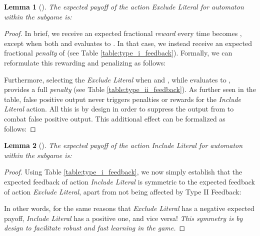 \documentclass[11pt,a4paper]{article}
\newtheorem{mylemma}{Lemma}
\begin{document}
\begin{mylemma}[]\label{lemma:exclude_literal}
The expected payoff of the action \emph{Exclude Literal} for automaton  within the subgame  is:

\end{mylemma}
\begin{proof}
In brief, we receive an expected fractional \emph{reward}  every time  becomes , except when both  and  evaluates to . In that case, we instead receive an expected fractional \emph{penalty} of  (see Table \ref{table:type_i_feedback}). Formally, we can reformulate this rewarding and penalizing as follows:

Furthermore, selecting the  \emph{Exclude Literal} when  and , while  evaluates to , provides a full \emph{penalty} (see Table \ref{table:type_ii_feedback}). As further seen in the table, false positive output never triggers penalties or rewards for the \emph{Include Literal} action. All this is by design in order to suppress the output  from  to combat false positive output. This additional effect can be formalized as follows:

\end{proof}

\begin{mylemma}[]\label{lemma:include_literal}
The expected payoff of the action \emph{Include Literal} for automaton  within the subgame  is:

\end{mylemma}
\begin{proof}
Using Table \ref{table:type_i_feedback}, we now simply establish that the expected feedback of action \emph{Include Literal} is symmetric to the expected feedback of action \emph{Exclude Literal}, apart from not being affected by Type II Feedback:


In other words, for the same reasons that \emph{Exclude Literal} has a negative expected payoff, \emph{Include Literal} has a positive one, and vice versa! \emph{This symmetry is by design to facilitate robust and fast learning in the game.}
\end{proof}
\end{document}
